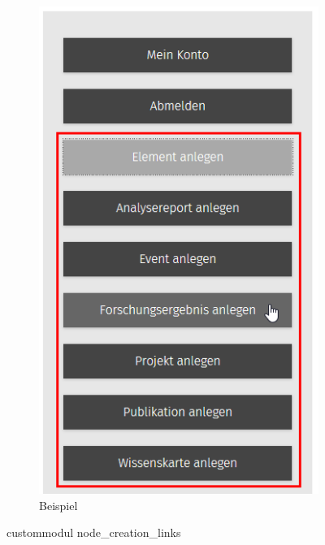 \begin{figure}[H]
	\begin{subfigure}[b]{0.4\textwidth}
		\centering
		\includegraphics[height=0.20\textheight]{images/example_nodecreationlinks}
		\caption[]{Beispiel}
		\label{fig:example_nodecreationlinks}
	\end{subfigure}
	\caption{\gls{custommodul} node\_creation\_links}
	\label{fig:nodecreationlinks}
\end{figure}

